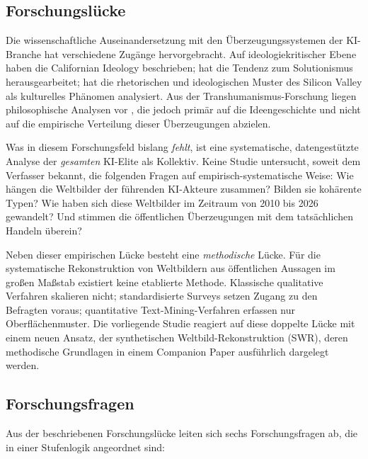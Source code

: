 \documentclass[12pt,a4paper]{article}
\begin{document}
\subsection{Forschungsl\"ucke}
\label{sec:einleitung:luecke}

Die wissenschaftliche Auseinandersetzung mit den \"Uberzeugungssystemen der KI-Branche hat verschiedene Zug\"ange hervorgebracht. Auf ideologiekritischer Ebene haben \citet{BarbCam1996} die \glqq Californian Ideology\grqq{} beschrieben; \citet{Morozov2013} hat die Tendenz zum Solutionismus herausgearbeitet; \citet{Daub2020} hat die rhetorischen und ideologischen Muster des Silicon Valley als kulturelles Ph\"anomen analysiert. Aus der Transhumanismus-Forschung liegen philosophische Analysen vor \citep{Bostrom2005, MoreVitaMore2013, Coeckelbergh2020}, die jedoch prim\"ar auf die Ideengeschichte und nicht auf die empirische Verteilung dieser \"Uberzeugungen abzielen.

Was in diesem Forschungsfeld bislang \emph{fehlt}, ist eine systematische, datengest\"utzte Analyse der \emph{gesamten} KI-Elite als Kollektiv. Keine Studie untersucht, soweit dem Verfasser bekannt, die folgenden Fragen auf empirisch-systematische Weise: Wie h\"angen die Weltbilder der f\"uhrenden KI-Akteure zusammen? Bilden sie koh\"arente Typen? Wie haben sich diese Weltbilder im Zeitraum von 2010 bis 2026 gewandelt? Und stimmen die \"offentlichen \"Uberzeugungen mit dem tats\"achlichen Handeln \"uberein?

Neben dieser empirischen L\"ucke besteht eine \emph{methodische} L\"ucke. F\"ur die systematische Rekonstruktion von Weltbildern aus \"offentlichen Aussagen im gro\ss{}en Ma\ss{}stab existiert keine etablierte Methode. Klassische qualitative Verfahren skalieren nicht; standardisierte Surveys setzen Zugang zu den Befragten voraus; quantitative Text-Mining-Verfahren erfassen nur Oberfl\"achenmuster. Die vorliegende Studie reagiert auf diese doppelte L\"ucke mit einem neuen Ansatz, der synthetischen Weltbild-Rekonstruktion (SWR), deren methodische Grundlagen in einem Companion Paper \citep{Geiger2026SWR} ausf\"uhrlich dargelegt werden.


\subsection{Forschungsfragen}
\label{sec:einleitung:fragen}

Aus der beschriebenen Forschungsl\"ucke leiten sich sechs Forschungsfragen ab, die in einer Stufenlogik angeordnet sind:
\end{document}
